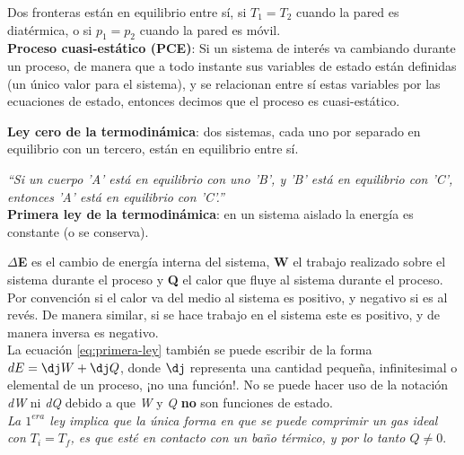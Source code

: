 Dos fronteras están en equilibrio entre sí, si $T_1 = T_2$ cuando la pared es diatérmica, o si $p_1 = p_2$ cuando la pared es móvil.
\\

\textbf{Proceso cuasi-estático (PCE)}: Si un sistema de interés va cambiando durante un proceso, de manera que a todo instante sus variables de estado están definidas (un único valor para el sistema), y se relacionan entre sí estas variables por las ecuaciones de estado, entonces decimos que el proceso es cuasi-estático. 
\\
\newpage


\textbf{Ley cero de la termodinámica}: dos sistemas, cada uno por separado en equilibrio con un tercero, están en equilibrio entre sí.

\textit{\enquote{Si un cuerpo 'A' está en equilibrio con uno 'B', y 'B' está en equilibrio con 'C', entonces 'A' está en equilibrio con 'C'.}}
\\

\textbf{Primera ley de la termodinámica}: en un sistema aislado la energía es constante (o se conserva).

\insertequation[\label{eq:primera-ley}]{\Delta E = W + Q}

\textbf{$\Delta$E} es el cambio de energía interna del sistema, \textbf{W} el trabajo realizado sobre el sistema durante el proceso y \textbf{Q} el calor que fluye al sistema durante el proceso. Por convención si el calor va del medio al sistema es positivo, y negativo si es al revés. De manera similar, si se hace trabajo en el sistema este es positivo, y de manera inversa es negativo.
\\

La ecuación \ref{eq:primera-ley} también se puede escribir de la forma $dE = \dj W + \dj Q$, donde $\dj$ representa una cantidad pequeña, infinitesimal o elemental de un proceso, ¡no una función!. No se puede hacer uso de la notación \textit{dW} ni \textit{dQ} debido a que \textit{W} y \textit{Q} \textbf{no} son funciones de estado.
\\

\textit{La $1^{era}$ ley implica que la única forma en que se puede comprimir un gas ideal con $T_i = T_f$, es que esté en contacto con un baño térmico, y por lo tanto $Q \ne 0$}.
\\[1.4em]

